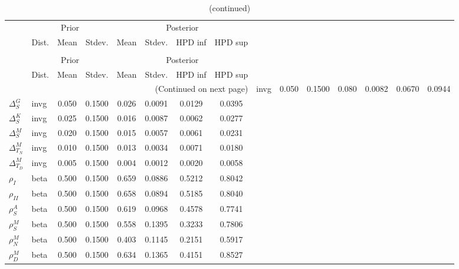  
\begin{center}
\begin{longtable}{llcccccc} 
\caption{Results from Metropolis-Hastings (parameters)}
 \label{Table:MHPosterior:1}\\
\toprule 
  & \multicolumn{3}{c}{Prior}  &  \multicolumn{4}{c}{Posterior} \\
  \cmidrule(r{.75em}){2-4} \cmidrule(r{.75em}){5-8}
  & Dist. & Mean  & Stdev. & Mean & Stdev. & HPD inf & HPD sup\\
\midrule \endfirsthead 
\caption{(continued)}\\\toprule 
  & \multicolumn{3}{c}{Prior}  &  \multicolumn{4}{c}{Posterior} \\
  \cmidrule(r{.75em}){2-4} \cmidrule(r{.75em}){5-8}
  & Dist. & Mean  & Stdev. & Mean & Stdev. & HPD inf & HPD sup\\
\midrule \endhead 
\bottomrule \multicolumn{8}{r}{(Continued on next page)} \endfoot 
\bottomrule \endlastfoot 
${\Delta^{A}_{S}}$ & invg &   0.050 & 0.1500 &   0.080& 0.0082 &  0.0670 &  0.0944 \\ 
${\Delta^{G}_{S}}$ & invg &   0.050 & 0.1500 &   0.026& 0.0091 &  0.0129 &  0.0395 \\ 
${\Delta^{K}_{S}}$ & invg &   0.025 & 0.1500 &   0.016& 0.0087 &  0.0062 &  0.0277 \\ 
${\Delta^{M}_{S}}$ & invg &   0.020 & 0.1500 &   0.015& 0.0057 &  0.0061 &  0.0231 \\ 
${\Delta^{M}_{T_N}}$ & invg &   0.010 & 0.1500 &   0.013& 0.0034 &  0.0071 &  0.0180 \\ 
${\Delta^{M}_{T_D}}$ & invg &   0.005 & 0.1500 &   0.004& 0.0012 &  0.0020 &  0.0058 \\ 
${\rho_{I}}$ & beta &   0.500 & 0.1500 &   0.659& 0.0886 &  0.5212 &  0.8042 \\ 
${\rho_{II}}$ & beta &   0.500 & 0.1500 &   0.658& 0.0894 &  0.5185 &  0.8040 \\ 
${\rho^{A}_{S}}$ & beta &   0.500 & 0.1500 &   0.619& 0.0968 &  0.4578 &  0.7741 \\ 
${\rho^{M}_{S}}$ & beta &   0.500 & 0.1500 &   0.558& 0.1395 &  0.3233 &  0.7806 \\ 
${\rho^{M}_{N}}$ & beta &   0.500 & 0.1500 &   0.403& 0.1145 &  0.2151 &  0.5917 \\ 
${\rho^{M}_{D}}$ & beta &   0.500 & 0.1500 &   0.634& 0.1365 &  0.4151 &  0.8527 \\ 
\end{longtable}
 \end{center}
